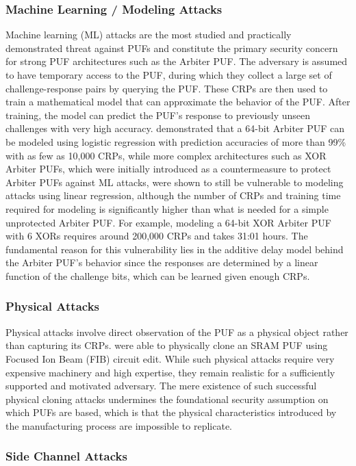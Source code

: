 \subsubsection{Machine Learning / Modeling Attacks}
Machine learning (ML) attacks are the most studied and practically demonstrated threat against PUFs and constitute the primary security concern for strong PUF architectures such as the Arbiter PUF. The adversary is assumed to have temporary access to the PUF, during which they collect a large set of challenge-response pairs by querying the PUF. These CRPs are then used to train a mathematical model that can approximate the behavior of the PUF. After training, the model can predict the PUF's response to previously unseen challenges with very high accuracy. \cite{10.1145/1866307.1866335} demonstrated that a 64-bit Arbiter PUF can be modeled using logistic regression with prediction accuracies of more than 99\% with as few as 10,000 CRPs, while more complex architectures such as XOR Arbiter PUFs, which were initially introduced as a countermeasure to protect Arbiter PUFs against ML attacks, were shown to still be vulnerable to modeling attacks using linear regression, although the number of CRPs and training time required for modeling is significantly higher than what is needed for a simple unprotected Arbiter PUF. For example, modeling a 64-bit XOR Arbiter PUF with 6 XORs requires around 200,000 CRPs and takes 31:01 hours. The fundamental reason for this vulnerability lies in the additive delay model behind the Arbiter PUF's behavior since the responses are determined by a linear function of the challenge bits, which can be learned given enough CRPs. 

\subsubsection{Physical Attacks}
Physical attacks involve direct observation of the PUF as a physical object rather than capturing its CRPs. \cite{6581556} were able to physically clone an SRAM PUF using Focused Ion Beam (FIB) circuit edit. While such physical attacks require very expensive machinery and high expertise, they remain realistic for a sufficiently supported and motivated adversary. The mere existence of such successful physical cloning attacks undermines the foundational security assumption on which PUFs are based, which is that the physical characteristics introduced by the manufacturing process are impossible to replicate.

\subsubsection{Side Channel Attacks}

